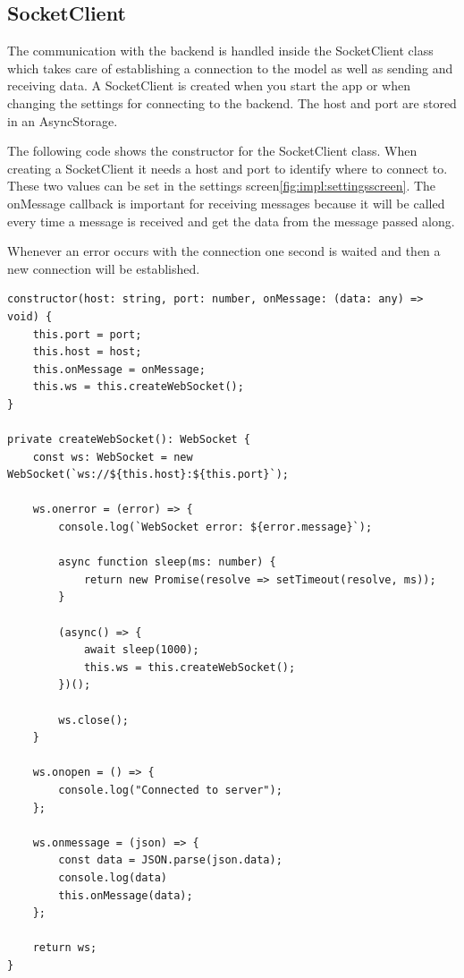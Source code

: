 \FloatBarrier

\subsection{SocketClient}

The communication with the backend is handled inside the SocketClient class which takes care of establishing a connection to the model as well as sending and receiving data.
A SocketClient is created when you start the app or when changing the settings for connecting to the backend. The host and port are stored in an AsyncStorage.

The following code shows the constructor for the SocketClient class.
When creating a SocketClient it needs a host and port to identify where to connect to. These two values can be set in the settings screen\ref{fig:impl:settingsscreen}.
The onMessage callback is important for receiving messages because it will be called every time a message is received and get the data from the message passed along.

Whenever an error occurs with the connection one second is waited and then a new connection will be established.

\begin{lstlisting}[caption=Constructor for the SocketClient,label=lst:impl:constructorSocketClient]
constructor(host: string, port: number, onMessage: (data: any) => void) {
    this.port = port;
    this.host = host;
    this.onMessage = onMessage;
    this.ws = this.createWebSocket();
}

private createWebSocket(): WebSocket {
    const ws: WebSocket = new WebSocket(`ws://${this.host}:${this.port}`);

    ws.onerror = (error) => {
        console.log(`WebSocket error: ${error.message}`);

        async function sleep(ms: number) {
            return new Promise(resolve => setTimeout(resolve, ms));
        }

        (async() => {
            await sleep(1000);
            this.ws = this.createWebSocket();
        })();
        
        ws.close();
    }

    ws.onopen = () => {
        console.log("Connected to server");
    };

    ws.onmessage = (json) => {
        const data = JSON.parse(json.data);
        console.log(data)
        this.onMessage(data);
    };

    return ws;
}
\end{lstlisting}

